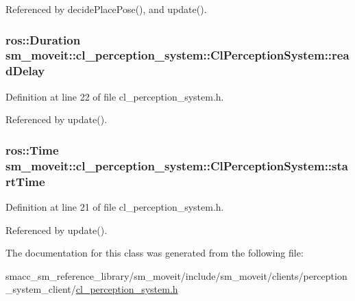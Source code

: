 Referenced by decide\+Place\+Pose(), and update().

\subsubsection[{\texorpdfstring{read\+Delay}{readDelay}}]{\setlength{\rightskip}{0pt plus 5cm}ros\+::\+Duration sm\+\_\+moveit\+::cl\+\_\+perception\+\_\+system\+::\+Cl\+Perception\+System\+::read\+Delay}\hypertarget{classsm__moveit_1_1cl__perception__system_1_1ClPerceptionSystem_a9aa5caee6cc5bfbbba2717d2073ead39}{}\label{classsm__moveit_1_1cl__perception__system_1_1ClPerceptionSystem_a9aa5caee6cc5bfbbba2717d2073ead39}


Definition at line 22 of file cl\+\_\+perception\+\_\+system.\+h.



Referenced by update().

\subsubsection[{\texorpdfstring{start\+Time}{startTime}}]{\setlength{\rightskip}{0pt plus 5cm}ros\+::\+Time sm\+\_\+moveit\+::cl\+\_\+perception\+\_\+system\+::\+Cl\+Perception\+System\+::start\+Time}\hypertarget{classsm__moveit_1_1cl__perception__system_1_1ClPerceptionSystem_a115fa9b61255bafa00931484f60d993a}{}\label{classsm__moveit_1_1cl__perception__system_1_1ClPerceptionSystem_a115fa9b61255bafa00931484f60d993a}


Definition at line 21 of file cl\+\_\+perception\+\_\+system.\+h.



Referenced by update().



The documentation for this class was generated from the following file\+:\begin{DoxyCompactItemize}
\item 
smacc\+\_\+sm\+\_\+reference\+\_\+library/sm\+\_\+moveit/include/sm\+\_\+moveit/clients/perception\+\_\+system\+\_\+client/\hyperlink{cl__perception__system_8h}{cl\+\_\+perception\+\_\+system.\+h}\end{DoxyCompactItemize}
